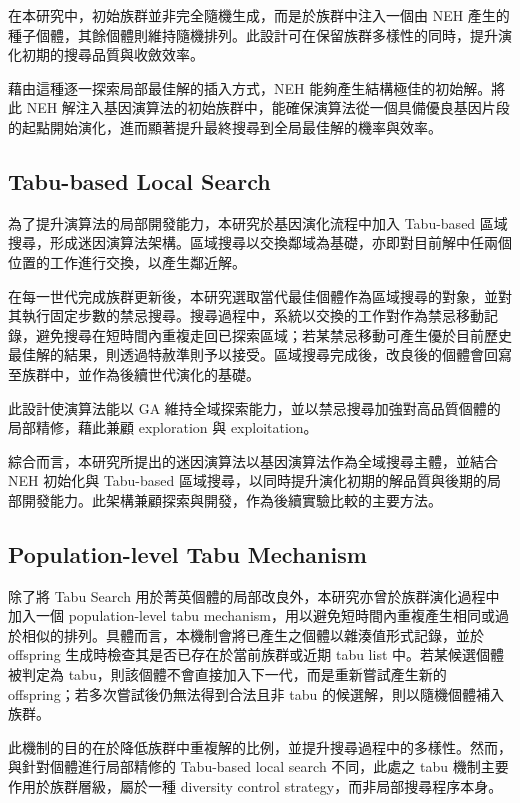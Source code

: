 \documentclass[conference]{IEEEtran}
\begin{document}
在本研究中，初始族群並非完全隨機生成，而是於族群中注入一個由 NEH 產生的種子個體，其餘個體則維持隨機排列。此設計可在保留族群多樣性的同時，提升演化初期的搜尋品質與收斂效率。

藉由這種逐一探索局部最佳解的插入方式，NEH 能夠產生結構極佳的初始解。將此 NEH 解注入基因演算法的初始族群中，能確保演算法從一個具備優良基因片段的起點開始演化，進而顯著提升最終搜尋到全局最佳解的機率與效率。

\subsection{Tabu-based Local Search}
為了提升演算法的局部開發能力，本研究於基因演化流程中加入 Tabu-based 區域搜尋，形成迷因演算法架構。區域搜尋以交換鄰域為基礎，亦即對目前解中任兩個位置的工作進行交換，以產生鄰近解。

在每一世代完成族群更新後，本研究選取當代最佳個體作為區域搜尋的對象，並對其執行固定步數的禁忌搜尋。搜尋過程中，系統以交換的工作對作為禁忌移動記錄，避免搜尋在短時間內重複走回已探索區域；若某禁忌移動可產生優於目前歷史最佳解的結果，則透過特赦準則予以接受。區域搜尋完成後，改良後的個體會回寫至族群中，並作為後續世代演化的基礎。

此設計使演算法能以 GA 維持全域探索能力，並以禁忌搜尋加強對高品質個體的局部精修，藉此兼顧 exploration 與 exploitation。

綜合而言，本研究所提出的迷因演算法以基因演算法作為全域搜尋主體，並結合 NEH 初始化與 Tabu-based 區域搜尋，以同時提升演化初期的解品質與後期的局部開發能力。此架構兼顧探索與開發，作為後續實驗比較的主要方法。

\subsection{Population-level Tabu Mechanism}

除了將 Tabu Search 用於菁英個體的局部改良外，本研究亦曾於族群演化過程中加入一個 population-level tabu mechanism，用以避免短時間內重複產生相同或過於相似的排列。具體而言，本機制會將已產生之個體以雜湊值形式記錄，並於 offspring 生成時檢查其是否已存在於當前族群或近期 tabu list 中。若某候選個體被判定為 tabu，則該個體不會直接加入下一代，而是重新嘗試產生新的 offspring；若多次嘗試後仍無法得到合法且非 tabu 的候選解，則以隨機個體補入族群。

此機制的目的在於降低族群中重複解的比例，並提升搜尋過程中的多樣性。然而，與針對個體進行局部精修的 Tabu-based local search 不同，此處之 tabu 機制主要作用於族群層級，屬於一種 diversity control strategy，而非局部搜尋程序本身。
\newpage
\end{document}
